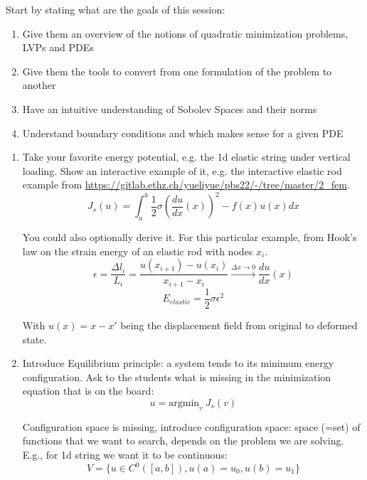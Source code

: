Start by stating what are the goals of this session:
\begin{enumerate}
    \item Give them an overview of the notions of quadratic minimization problems, LVPs and PDEs
    \item Give them the tools to convert from one formulation of the problem to another
    \item Have an intuitive understanding of Sobolev Spaces and their norms
    \item Understand boundary conditions and which makes sense for a given PDE
\end{enumerate}


\begin{enumerate}
    \item 
Take your favorite energy potential, e.g. the 1d elastic string under vertical loading. Show an interactive example of it, e.g. the interactive elastic rod example from \url{https://gitlab.ethz.ch/yueliyue/pbs22/-/tree/master/2_fem}. 
\begin{equation}
    J_s(u) = \int_a^b \frac{1}{2}\sigma (\frac{du}{dx}(x))^2 - f(x)u(x) dx
\end{equation}

You could also optionally derive it. For this particular example, from Hook's law on the strain energy of an elastic rod with nodes $x_i$. 
\begin{equation}
    \epsilon = \frac{\Delta l_i}{L_i} = \frac{u(x_{i+1}) - u(x_i)}{x_{i+1} - x_i} \xrightarrow{\Delta x \rightarrow 0} \frac{du}{dx}(x)
\end{equation}
\begin{equation}
    E_{elastic} = \frac{1}{2}\sigma\epsilon^2
\end{equation}

With $u(x) = x - x'$ being the displacement field from original to deformed state.

\item
Introduce Equilibrium principle: a system tends to its minimum energy configuration. Ask to the students what is missing in the minimization equation that is on the board:
\begin{equation}
    u = \text{argmin}_v \ J_s(v)
\end{equation}

Configuration space is missing, introduce configuration space: space (=set) of functions that we want to search, depends on the problem we are solving. E.g., for 1d string we want it to be continuous:
\begin{equation}
    V = \{u \in C^0([a, b]), u(a) = u_0, u(b) = u_1\}
\end{equation}


\end{enumerate}
